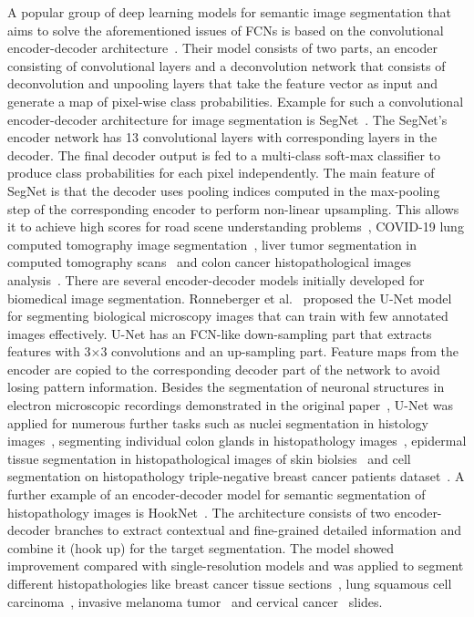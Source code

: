 A popular group of deep learning models for semantic image segmentation that aims to solve the aforementioned issues of FCNs is based on the convolutional encoder-decoder architecture~\cite{noh2015learning}. Their model consists of two parts, an encoder consisting of convolutional layers and a deconvolution network that consists of deconvolution and unpooling layers that take the feature vector as input and generate a map of pixel-wise class probabilities. Example for such a convolutional encoder-decoder architecture for image segmentation is SegNet~\cite{badrinarayanan2017segnet}. The SegNet's encoder network has 13 convolutional layers with corresponding layers in the decoder. The final decoder output is fed to a multi-class soft-max classifier to produce class probabilities for each pixel independently. The main feature of SegNet is that the decoder uses pooling indices computed in the max-pooling step of the corresponding encoder to perform non-linear upsampling. This allows it to achieve high scores for road scene understanding problems~\cite{badrinarayanan2017segnet}, COVID-19 lung computed tomography image segmentation~\cite{saood2021covid}, liver tumor segmentation in computed tomography scans~\cite{almotairi2020liver} and colon cancer histopathological images analysis~\cite{hamida2021deep}. There are several encoder-decoder models initially developed for biomedical image segmentation. Ronneberger et al.~\cite{10.1007/978-3-319-24574-4_28} proposed the U-Net model for segmenting biological microscopy images that can train with few annotated images effectively. U-Net has an FCN-like down-sampling part that extracts features with 3$\times$3 convolutions and an up-sampling part. Feature maps from the encoder are copied to the corresponding decoder part of the network to avoid losing pattern information. Besides the segmentation of neuronal structures in electron microscopic recordings demonstrated in the original paper~\cite{10.1007/978-3-319-24574-4_28}, U-Net was applied for numerous further tasks such as nuclei segmentation in histology images~\cite{lagree2021review, zeng2019ric}, segmenting individual colon glands in histopathology images~\cite{pinckaers2019neural}, epidermal tissue segmentation in histopathological images of skin biolsies~\cite{oskal2019u} and cell segmentation on histopathology triple-negative breast cancer patients dataset~\cite{bagdigen2020cell}. A further example of an encoder-decoder model for semantic segmentation of histopathology images is HookNet~\cite{van2021hooknet}. The architecture consists of two encoder-decoder branches to extract contextual and fine-grained detailed information and combine it (hook up) for the target segmentation. The model showed improvement compared with single-resolution models and was applied to segment different histopathologies like breast cancer tissue sections~\cite{van2021hooknet}, lung squamous cell carcinoma~\cite{van2021hooknet}, invasive melanoma tumor~\cite{shahdeep} and cervical cancer~\cite{meng2021cervical} slides.

